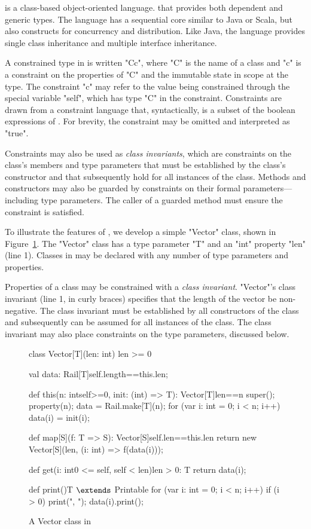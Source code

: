 \Xten{} is a class-based object-oriented language.
that provides both dependent and generic types.
The language has a sequential core similar to Java or Scala, but
also
constructs for concurrency and distribution.
Like Java, the language provides single class
inheritance and multiple interface inheritance.

A constrained type in \Xten{} is written \xcd"C{c}", where \xcd"C" is the
name of a class and \xcd"c" is a constraint on the properties
of \xcd"C" and the immutable state in scope at the type.  The
constraint \xcd"c" may refer to the value being constrained through
the special variable \xcd"self", which has type \xcd"C" in the
constraint.  Constraints are drawn from a constraint language that,
syntactically, is a subset of the boolean expressions of \Xten{}.  For
brevity, the constraint may be omitted and interpreted as \xcd"true".

Constraints may also be used as \emph{class invariants}, 
which are constraints on the class's members and type parameters 
that must be established by the class's
constructor and that subsequently hold for all instances of the class.
Methods and constructors may also be guarded by constraints on
their formal parameters---including type parameters. The
caller of a guarded method must ensure the constraint is
satisfied.

To illustrate the features of \Xten{}, we
develop a simple \xcd"Vector"
class, shown in Figure~\ref{fig:vector}.
The \xcd"Vector" class has a type parameter \xcd"T" and an \xcd"int"
property \xcd"len" (line 1).
Classes in \Xten{} may be declared with any number of type
parameters and properties.

Properties of a class may be constrained with 
a \emph{class invariant}.
\xcd"Vector"'s class invariant (line 1, in curly braces)
specifies that the length of
the vector be non-negative.
The class invariant must be established by all constructors of
the class and subsequently can be assumed for all instances of the class.
The class invariant may also place constraints on the type
parameters, discussed below.

\begin{figure}
{\footnotesize
\begin{numberedxten}
class Vector[T](len: int) {len >= 0} {
  val data: Rail[T]{self.length==this.len};

  def this(n: int{self>=0}, init: (int) => T):
        Vector[T]{len==n} {
    super();
    property(n);
    data = Rail.make[T](n);
    for (var i: int = 0; i < n; i++) {
      data(i) = init(i);
    }
  }

  def map[S](f: T => S): Vector[S]{self.len==this.len} {
    return new Vector[S](len, (i: int) => f(data(i)));
  }

  def get(i: int{0 <= self, self < len}){len > 0}: T {
    return data(i);
  }

  def print(){T $\extends$ Printable} {
    for (var i: int = 0; i < n; i++) {
      if (i > 0)
        print(", ");
      data(i).print();
    }
  }
}
\end{numberedxten}}
\caption{A Vector class in \Xten}
\label{fig:vector}
\end{figure}

